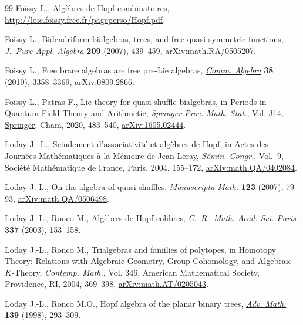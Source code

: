 \documentclass[10pt,a4paper]{amsart}
\numberwithin{equation}{section}
\theoremstyle{definition}
\theoremstyle{plain}
\begin{document}
\begin{thebibliography}{99}
Foissy L., Alg\`ebres de {Hopf} combinatoires,
 \url{http://loic.foissy.free.fr/pageperso/Hopf.pdf}.

Foissy L., Bidendriform bialgebras, trees, and free quasi-symmetric functions,
 \href{https://doi.org/10.1016/j.jpaa.2006.06.005}{\textit{J.~Pure Appl. Algebra}} \textbf{209} (2007), 439--459,
 \href{https://arxiv.org/abs/math.RA/0505207}{arXiv:math.RA/0505207}.

Foissy L., Free brace algebras are free pre-{L}ie algebras, \href{https://doi.org/10.1080/00927870903115000}{\textit{Comm.
 Algebra}} \textbf{38} (2010), 3358--3369, \href{https://arxiv.org/abs/0809.2866}{arXiv:0809.2866}.

Foissy L., Patras F., Lie theory for quasi-shuffle bialgebras, in Periods in
 {Q}uantum {F}ield {T}heory and {A}rithmetic, \textit{Springer Proc. Math.
 Stat.}, Vol. 314, \href{https://doi.org/10.1007/978-3-030-37031-2_19}{Springer}, Cham, 2020, 483--540, \href{https://arxiv.org/abs/1605.02444}{arXiv:1605.02444}.

Loday J.--L., Scindement d'associativit\'e et alg\`ebres de {H}opf, in Actes des
 {J}ourn\'ees {M}ath\'ematiques \`a la {M}\'emoire de {J}ean {L}eray,
 \textit{S\'emin. Congr.}, Vol.~9, Soci\'et\'e Math\'ematique de France,
 Paris, 2004, 155--172, \href{https://arxiv.org/abs/math.QA/0402084}{arXiv:math.QA/0402084}.

Loday J.-L., On the algebra of quasi-shuffles, \href{https://doi.org/10.1007/s00229-007-0086-2}{\textit{Manuscripta Math.}}
 \textbf{123} (2007), 79--93, \href{https://arxiv.org/abs/math.QA/0506498}{arXiv:math.QA/0506498}.

Loday J.-L., Ronco M., Alg\`ebres de {H}opf colibres, \href{https://doi.org/10.1016/S1631-073X(03)00288-7}{\textit{C.~R.~Math. Acad.
 Sci. Paris}} \textbf{337} (2003), 153--158.

Loday J.-L., Ronco M., Trialgebras and families of polytopes, in Homotopy
 {T}heory: {R}elations with {A}lgebraic {G}eometry, {G}roup {C}ohomology, and
 {A}lgebraic {$K$}-{T}heory, \textit{Contemp. Math.}, Vol. 346, American
 Mathematical Society, Providence, RI, 2004, 369--398,
 \href{https://arxiv.org/abs/math.AT/0205043}{arXiv:math.AT/0205043}.

Loday J.-L., Ronco M.O., Hopf algebra of the planar binary trees, \href{https://doi.org/10.1006/aima.1998.1759}{\textit{Adv.
 Math.}} \textbf{139} (1998), 293--309.


\end{thebibliography}
\end{document}
